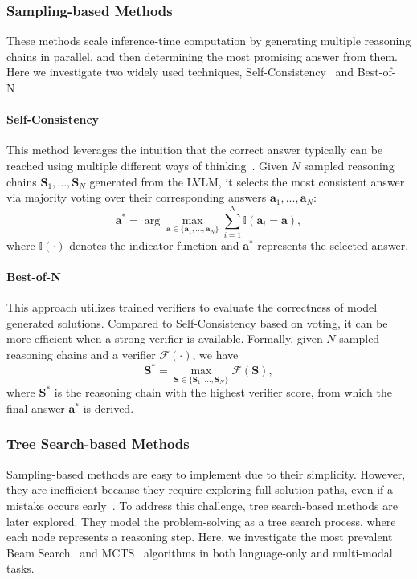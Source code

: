 \subsubsection{Sampling-based Methods}
These methods scale inference-time computation by generating multiple reasoning chains in parallel, and then determining the most promising answer from them. Here we investigate two widely used techniques, Self-Consistency~\cite{tts2-Self-Consistency} and Best-of-N~\cite{tts-mcts1, tts-mcts3}.

\paragraph{Self-Consistency}
This method leverages the intuition that the correct answer typically can be reached using multiple different ways of thinking~\cite{tts2-Self-Consistency}.
Given $N$ sampled reasoning chains $\mathbf{S}_1,...,\mathbf{S}_N$ generated from the LVLM, it selects the most consistent answer via majority voting over their corresponding answers $\mathbf{a}_1,...,\mathbf{a}_N$:
\begin{equation}
    \mathbf{a}^* = \arg\max_{\mathbf{a} \in \{\mathbf{a}_1,...,\mathbf{a}_N\}} \sum_{i=1}^{N} \mathbb{I}(\mathbf{a}_i = \mathbf{a}),
\end{equation}
where $\mathbb{I}(\cdot)$ denotes the indicator function and $\mathbf{a}^*$ represents the selected answer.


\paragraph{Best-of-N}
This approach utilizes trained verifiers to evaluate the correctness of model generated solutions.
Compared to Self-Consistency based on voting, it can be more efficient when a strong verifier is available.
Formally, given $N$ sampled reasoning chains and a verifier $\mathcal{F}(\cdot)$, we have
\begin{equation}
    \mathbf{S}^*=\max_{\mathbf{S}\in \{\mathbf{S}_1,...,\mathbf{S}_N\} }\mathcal{F}(\mathbf{S}),
\end{equation}
where $\mathbf{S}^*$ is the reasoning chain with the highest verifier score, from which the final answer $\mathbf{a}^*$ is derived.



\subsubsection{Tree Search-based Methods}
Sampling-based methods are easy to implement due to their simplicity.
However, they are inefficient because they require exploring full solution paths, even if a mistake occurs early~\cite{xiang2025towards}.
To address this challenge, tree search-based methods are later explored.
They model the problem-solving as a tree search process, where each node represents a reasoning step.
Here, we investigate the most prevalent Beam Search~\cite{tts-bs1, tts-bs2, tot, tts-bs3} and MCTS~\cite{tts-mcts5,tts-mcts8,  tts-mcts2, tts-mcts4, tts-mcts6, tts-mcts7, yao2024mulberry} algorithms in both language-only and multi-modal tasks.


